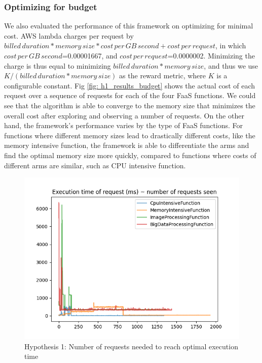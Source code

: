 \documentclass[conference]{IEEEtran}
\begin{document}
\subsubsection{Optimizing for budget}
We also evaluated the performance of this framework on optimizing for minimal cost. AWS lambda charges per request by $billed\, duration * memory\, size*cost\, per\, GB\,second + cost \,per \, request$, in which $cost \, per \, GB \, second$=0.00001667, and $cost \, per \, request$=0.0000002. Minimizing the charge is thus equal to minimizing $billed\, duration * memory\, size$, and thus we use $K/(billed\, duration * memory\, size)$ as the reward metric, where $K$ is a configurable constant. Fig \ref{fig: h1_results_budget} shows the actual cost of each request over a sequence of requests for each of the four FaaS functions. We could see that the algorithm is able to converge to the memory size that minimizes the overall cost after exploring and observing a number of requests. On the other hand, the framework's performance varies by the type of FaaS functions. For functions where different memory sizes lead to drastically different costs, like the memory intensive function, the framework is able to differentiate the arms and find the optimal memory size more quickly, compared to functions where costs of different arms are similar, such as CPU intensive function.

\begin{figure}
    \includegraphics[width=1\linewidth]{images/H1_ExecutionTimeVsNumberOfRequests.PNG}
    \caption{Hypothesis 1: Number of requests needed to reach optimal execution time}
    \label{fig: h1_results}
\end{figure}
\end{document}
